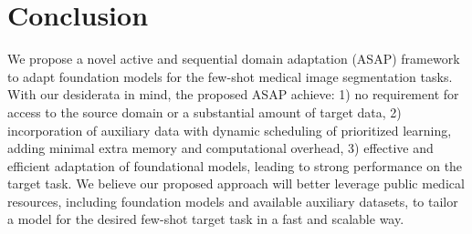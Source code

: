\vspace{-0.4cm}
\section{Conclusion}
\vspace{-0.3cm}
We propose a novel active and sequential domain adaptation (ASAP) framework to adapt foundation models for the few-shot medical image segmentation tasks. 
With our desiderata in mind, the proposed ASAP achieve:
1) no requirement for access to the source domain or a substantial amount of target data,
2) incorporation of auxiliary data with dynamic scheduling of prioritized learning, adding minimal extra memory and computational overhead,
3) effective and efficient adaptation of foundational models, leading to strong performance on the target task.
We believe our proposed approach will better leverage public medical resources, including foundation models and available auxiliary datasets, to tailor a model for the desired few-shot target task in a fast and scalable way. 
